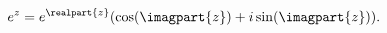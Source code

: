 \[e^{z}=e^{\realpart{z}}(\mathop{\cos\/}\nolimits\!\left(\imagpart{z}\right)+i%
\mathop{\sin\/}\nolimits\!\left(\imagpart{z}\right)).\]